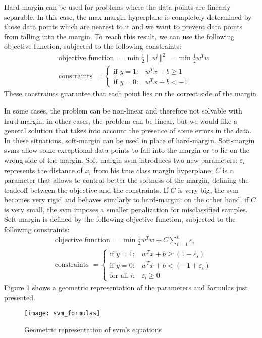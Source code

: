 Hard margin can be used for problems where the data points are linearly separable. In this case, the max-margin hyperplane is completely determined by those data points which are nearest to it and we want to prevent data points from falling into the margin. To reach this result, we can use the following objective function, subjected to the following constraints:
\begin{align}
    &\text{objective function }= \min \frac{1}{2}\|\vec{w}\|^2 =  \min \frac{1}{2} w^{T} w\\
    &\text{constraints }= \left\{\begin{array}{ll}{\text{if } y=1 :} & {w^{T} x+b \geq 1} \\ {\text{if } y=0 :} & {w^{T} x+b <-1}\end{array}\right.
\end{align}
These constraints guarantee that each point lies on the correct side of the margin.

In some cases, the problem can be non-linear and therefore not solvable with hard-margin; in other cases, the problem can be linear, but we would like a general solution that takes into account the presence of some errors in the data. In these situations, soft-margin can be used in place of hard-margin. Soft-margin \acsp{svm} allow some exceptional data points to fall into the margin or to lie on the wrong side of the margin. Soft-margin \acs{svm} introduces two new parameters: $\varepsilon_i$ represents the distance of $x_i$ from his true class margin hyperplane; $C$ is a parameter that allows to control better the softness of the margin, defining the tradeoff between the objective and the constraints. If $C$ is very big, the \acs{svm} becomes very rigid and behaves similarly to hard-margin; on the other hand, if $C$ is very small, the \acs{svm} imposes a smaller penalization for misclassified samples. Soft-margin is defined by the following objective function, subjected to the following constraints:
\begin{align}
    &\text{objective function }= \min \frac{1}{2} w^{T} w + C \sum^{n}_{i=1} \varepsilon_i\\
    &\text{constraints }= \left\{\begin{array}{lll}{\text{if } y=1 :} & {w^{T} x+b \geq (1 - \varepsilon_i)} \\ {\text{if } y=0 :} & {w^{T} x+b < (-1 + \varepsilon_i)} \\ {\text{for all } i :} & {\varepsilon_i \geq 0}\end{array}\right.
\end{align}
Figure \ref{fig:svm_formulas} shows a geometric representation of the parameters and formulas just presented.
\begin{figure}[htbp]
    \centering
    \texttt{[image: svm\_formulas]}
    \caption{Geometric representation of \acs{svm}'s equations}
    \label{fig:svm_formulas}
\end{figure}

